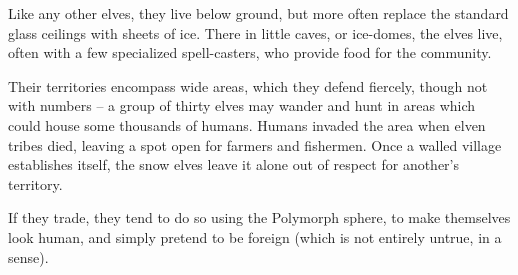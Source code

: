 \begin{multicols}{2}
Like any other elves, they live below ground, but more often replace the standard glass ceilings with sheets of ice.
There in little caves, or ice-domes, the elves live, often with a few specialized spell-casters, who provide food for the community.

Their territories encompass wide areas, which they defend fiercely, though not with numbers -- a group of thirty elves may wander and hunt in areas which could house some thousands of humans.
Humans invaded the area when elven tribes died, leaving a spot open for farmers and fishermen.
Once a walled village establishes itself, the snow elves leave it alone out of respect for another's territory.

If they trade, they tend to do so using the Polymorph sphere, to make themselves look human, and simply pretend to be foreign (which is not entirely untrue, in a sense).

\iftoggle{players}{
  \subsubsection{Character Concepts}

  \begin{itemize}

    \item
    A dilettante gnoll, who has gained too much of a taste for human luxuries to spend his time hunting to trade for a couple of cakes.
    She wants more.
    She wants jam, carrots, a fancy hat and a greatsword all of her own.
    \item
    A proud alchemist, too eager to talk about being from the place alchemists are trained.
    He wears no armour and thin clothing, relying on his magic to protect him from harm, and his birthright of cold-endurance to endure the elements.
    \item
    A wandering gnome, bent on showing that magic, trickery, and planning make him more of a warrior than large men carrying big sticks.

  \end{itemize}
}{
\subsubsection{Seasonal Encounters}

\paragraph{Cold} seasons in Eastlake are terrifying.
Hungry wolves become common; roll $2D6 + 2$ for the number.
Travelling through the cold also inflicts an additional 4 Fatigue Points per day.
}
\end{multicols}
